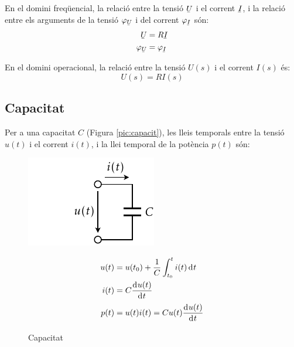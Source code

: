 En el domini freq\"{u}encial, la relaci\'{o} entre
la tensi\'{o} $\cmplx{U}$ i el corrent $\cmplx{I}$, i la relaci\'{o} entre els arguments de
la tensi\'{o} $\varphi_{\cmplx{U}}$ i del corrent $\varphi_{\cmplx{I}}$ s\'{o}n:
\begin{align}
   \cmplx{U} &= R \cmplx{I} \\ \varphi_{\cmplx{U}} &= \varphi_{\cmplx{I}}
\end{align}

 En el domini operacional, la relaci\'{o} entre la tensi\'{o} $U(s)$ i el corrent $I(s)$ \'{e}s:
\begin{equation}
   U(s) = R I(s)
\end{equation}

\subsection{Capacitat} 

Per a una capacitat $C$ (Figura
\vref{pic:capacit}), les lleis temporals entre la tensi\'{o} $u(t)$ i el
corrent $i(t)$, i la llei temporal de la pot\`{e}ncia $p(t)$ s\'{o}n:
\vspace{-1.5mm}
\begin{figure}[h!]
\hfill
\begin{minipage}[b]{5cm}
    \includegraphics{Imatges/Cap-Fonaments-Capacitat.pdf}
\caption{Capacitat} \label{pic:capacit}
\end{minipage}
\hfill
\begin{minipage}[b][3.8cm][t]{8cm}
   \begin{align}
      u(t) &= u(t_0) + \frac{1}{C} \int_{t_0}^t i(t) \diff t \\
      i(t) &= C \deriv{u(t)}{t} \\
      p(t) &= u(t) i(t) = C u(t) \deriv{u(t)}{t}
   \end{align}
\end{minipage}
\end{figure}

